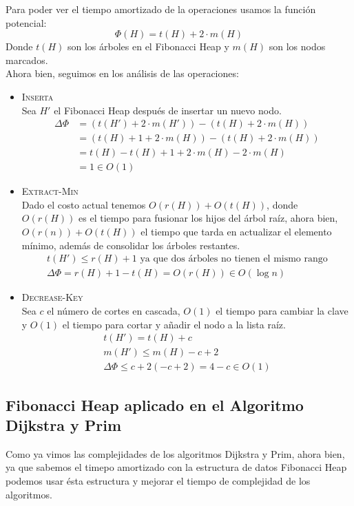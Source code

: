 \documentclass[a4paper, titlepage, 12pt]{article}
\theoremstyle{definition}%
\theoremstyle{Teorema}
\theoremstyle{break}
\begin{document}
Para poder ver el tiempo amortizado de la operaciones usamos la función potencial:
\begin{equation*}
  \Phi(H)=t(H)+2\cdot m(H)
\end{equation*}
Donde $t(H)$ son los árboles en el Fibonacci Heap y $m(H)$ son los nodos marcados.\\

Ahora bien, seguimos en los análisis de las operaciones:
\begin{itemize}
  \item \textsc{Inserta}\\
  Sea $H'$ el Fibonacci Heap después de insertar un nuevo nodo.
  \begin{align*}
    \Delta\Phi &= (t(H')+2\cdot m(H'))-(t(H)+2\cdot m(H))\\
    &=(t(H)+1+2\cdot m(H))-(t(H)+2\cdot m(H))\\
    &=t(H)-t(H)+1+2\cdot m(H)-2\cdot m(H)\\
    &= 1 \in O(1)
  \end{align*}
  \item \textsc{Extract-Min}\\
  Dado el costo actual tenemos $O(r(H))+O(t(H))$, donde $O(r(H))$ es el tiempo para fusionar 
  los hijos del árbol raíz, ahora bien, $O(r(n))+O(t(H))$ el tiempo que tarda en actualizar el 
  elemento mínimo, además de consolidar los árboles restantes.
  \begin{align*}
    t(H')\leq r(H) + 1 \text{ ya que dos árboles no tienen el mismo rango}\\
    \Delta\Phi = r(H)+1-t(H) = O(r(H)) \in O(\log n)
  \end{align*}
  \item \textsc{Decrease-Key}\\
  Sea $c$ el número de cortes en cascada, $O(1)$ el tiempo para cambiar la clave y $O(1)$ el tiempo 
  para cortar y añadir el nodo a la lista raíz.
  \begin{align*}
    t(H')=t(H)+c\\
    m(H')\leq m(H)-c+2\\
    \Delta\Phi \leq c+2(-c+2)=4-c \in O(1)
  \end{align*}
\end{itemize}

\subsection{Fibonacci Heap aplicado en el Algoritmo Dijkstra y Prim}
Como ya vimos las complejidades de los algoritmos Dijkstra y Prim, ahora bien, ya que sabemos el timepo 
amortizado con la estructura de datos Fibonacci Heap podemos usar ésta estructura y mejorar el tiempo de complejidad 
de los algoritmos.\\
\end{document}
